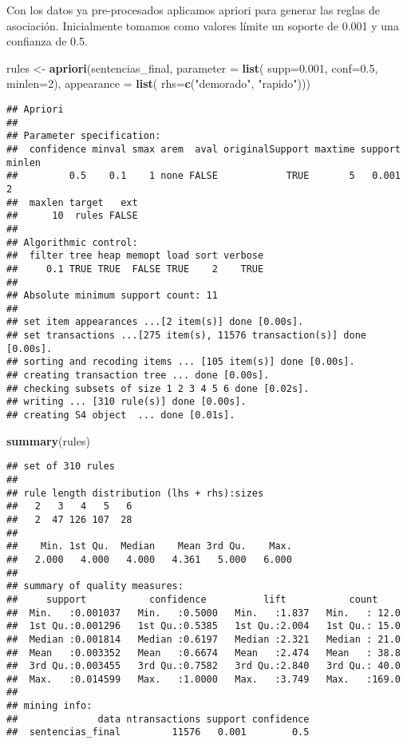 \documentclass[runningheads,a4paper]{llncs}
\newenvironment{Shaded}{\footnotesize}{}
\newcommand{\KeywordTok}[1]{\textcolor[rgb]{0.00,0.44,0.13}{\textbf{{#1}}}}
\newcommand{\DataTypeTok}[1]{\textcolor[rgb]{0.56,0.13,0.00}{{#1}}}
\newcommand{\DecValTok}[1]{\textcolor[rgb]{0.25,0.63,0.44}{{#1}}}
\newcommand{\FloatTok}[1]{\textcolor[rgb]{0.25,0.63,0.44}{{#1}}}
\newcommand{\StringTok}[1]{\textcolor[rgb]{0.25,0.44,0.63}{{#1}}}
\newcommand{\NormalTok}[1]{{#1}}
\begin{document}
Con los datos ya pre-procesados aplicamos apriori para generar las
reglas de asociación. Inicialmente tomamos como valores límite un
soporte de 0.001 y una confianza de 0.5.

\scriptsize

\begin{Shaded}
\begin{Highlighting}[]
\NormalTok{rules <-}\StringTok{ }\KeywordTok{apriori}\NormalTok{(sentencias_final, }\DataTypeTok{parameter =} \KeywordTok{list}\NormalTok{(}
  \DataTypeTok{supp=}\FloatTok{0.001}\NormalTok{, }\DataTypeTok{conf=}\FloatTok{0.5}\NormalTok{, }\DataTypeTok{minlen=}\DecValTok{2}\NormalTok{), }\DataTypeTok{appearance =} \KeywordTok{list}\NormalTok{(}
    \DataTypeTok{rhs=}\KeywordTok{c}\NormalTok{(}\StringTok{"demorado"}\NormalTok{, }\StringTok{"rapido"}\NormalTok{)))}
\end{Highlighting}
\end{Shaded}

\begin{verbatim}
## Apriori
## 
## Parameter specification:
##  confidence minval smax arem  aval originalSupport maxtime support minlen
##         0.5    0.1    1 none FALSE            TRUE       5   0.001      2
##  maxlen target   ext
##      10  rules FALSE
## 
## Algorithmic control:
##  filter tree heap memopt load sort verbose
##     0.1 TRUE TRUE  FALSE TRUE    2    TRUE
## 
## Absolute minimum support count: 11 
## 
## set item appearances ...[2 item(s)] done [0.00s].
## set transactions ...[275 item(s), 11576 transaction(s)] done [0.00s].
## sorting and recoding items ... [105 item(s)] done [0.00s].
## creating transaction tree ... done [0.00s].
## checking subsets of size 1 2 3 4 5 6 done [0.02s].
## writing ... [310 rule(s)] done [0.00s].
## creating S4 object  ... done [0.01s].
\end{verbatim}

\begin{Shaded}
\begin{Highlighting}[]
\KeywordTok{summary}\NormalTok{(rules)}
\end{Highlighting}
\end{Shaded}

\begin{verbatim}
## set of 310 rules
## 
## rule length distribution (lhs + rhs):sizes
##   2   3   4   5   6 
##   2  47 126 107  28 
## 
##    Min. 1st Qu.  Median    Mean 3rd Qu.    Max. 
##   2.000   4.000   4.000   4.361   5.000   6.000 
## 
## summary of quality measures:
##     support           confidence          lift           count      
##  Min.   :0.001037   Min.   :0.5000   Min.   :1.837   Min.   : 12.0  
##  1st Qu.:0.001296   1st Qu.:0.5385   1st Qu.:2.004   1st Qu.: 15.0  
##  Median :0.001814   Median :0.6197   Median :2.321   Median : 21.0  
##  Mean   :0.003352   Mean   :0.6674   Mean   :2.474   Mean   : 38.8  
##  3rd Qu.:0.003455   3rd Qu.:0.7582   3rd Qu.:2.840   3rd Qu.: 40.0  
##  Max.   :0.014599   Max.   :1.0000   Max.   :3.749   Max.   :169.0  
## 
## mining info:
##              data ntransactions support confidence
##  sentencias_final         11576   0.001        0.5
\end{verbatim}
\end{document}
